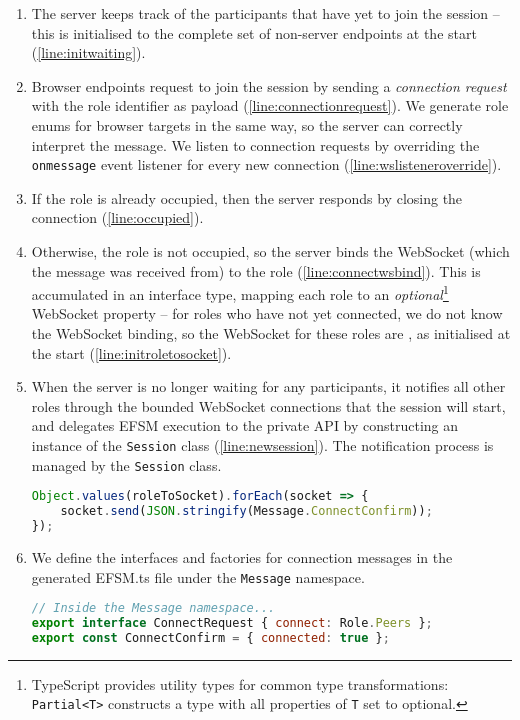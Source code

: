 \begin{enumerate}
\item
The server keeps track of the participants that 
have yet to join the session -- this is initialised to the
complete set of
non-server endpoints at the start (\cref{line:initwaiting}).

\item
Browser endpoints request to join the session
by sending a \textit{connection request} with the role
identifier as payload (\cref{line:connectionrequest}). 
We generate role enums for browser targets
in the same way, so the server can correctly
interpret the message.
We listen to connection requests by overriding the
\texttt{onmessage} event listener for every new connection
(\cref{line:wslisteneroverride}).

\item
If the role is already occupied, then the server
responds by closing the connection (\cref{line:occupied}).

\item
Otherwise, the role is not occupied, so the server binds
the WebSocket (which the message was received from) to the role
(\cref{line:connectwsbind}).
This is accumulated in an interface type, mapping each
role to an \textit{optional}\footnote{
TypeScript provides utility types for common type transformations:
\texttt{Partial<T>} constructs a type with all properties
of \texttt{T} set to optional.
} 
WebSocket property
-- for roles who have
not yet connected, we do not know the WebSocket binding, so the
WebSocket for these roles are ,
as initialised at the start (\cref{line:initroletosocket}).

\item
When the server is no longer waiting for any participants,
it notifies all other roles through the bounded WebSocket
connections that the session will start, and delegates
EFSM execution to the private API by constructing
an instance of the \texttt{Session} class (\cref{line:newsession}).
The notification process is managed by the \texttt{Session} class.

\begin{lstlisting}[language=javascript,tabsize=2,numbers=none]
Object.values(roleToSocket).forEach(socket => {
	socket.send(JSON.stringify(Message.ConnectConfirm));
});
\end{lstlisting}

\item
We define the interfaces and factories for connection messages 
in the generated EFSM.ts file under
the \texttt{Message} namespace.

\begin{lstlisting}[language=javascript,tabsize=2,numbers=none]
// Inside the Message namespace...
export interface ConnectRequest { connect: Role.Peers };
export const ConnectConfirm = { connected: true };
\end{lstlisting}
\end{enumerate}

